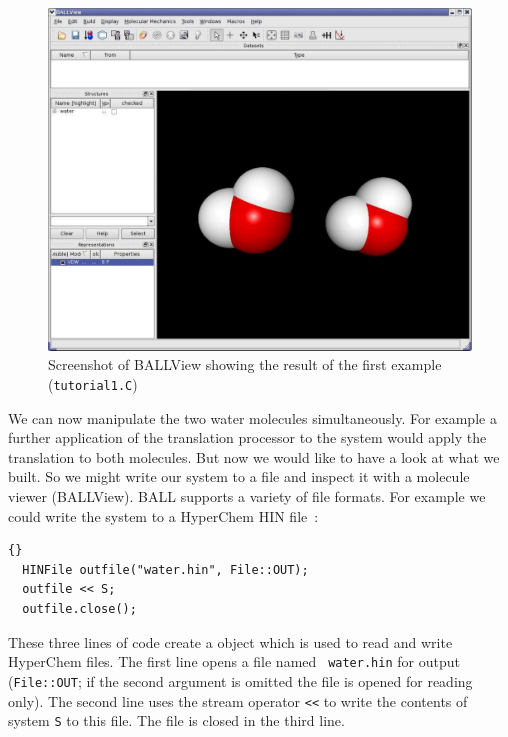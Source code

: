 \begin{figure}[t]
  \centering
  \includegraphics[width=\textwidth]{tut1_screenshot}
  \caption{Screenshot of BALLView showing the result of the first example
           ({\tt tutorial1.C})}
  \label{fig:tut1-screenshot}
\end{figure}
\noindent
We can now manipulate the two water molecules simultaneously. For example a
further application of the translation processor to the system would apply
the translation to both molecules.
But now we would like to have a look at what we built. So we might write our
system to a file and inspect it with a molecule viewer (\eg BALLView).
BALL supports a variety of file formats. For example we could write the system
to a HyperChem HIN file~\cite{HyperChem}:
\begin{lstlisting}{}
  HINFile outfile("water.hin", File::OUT);
  outfile << S;
  outfile.close();
\end{lstlisting}
\noindent
These three lines of code create a  object which is used to
read and write HyperChem files. The first line opens a file named {\tt
water.hin} for output ({\tt File::OUT}; if the second argument is omitted the
file is opened for reading only).
The second line uses the stream operator {\tt <<} to write the contents
of system {\tt S} to this file. The file is closed in the third line.


